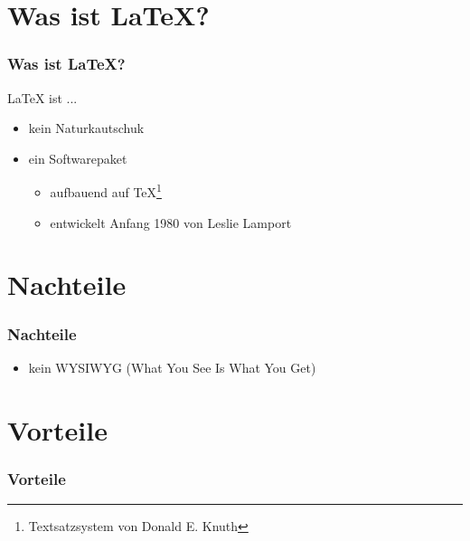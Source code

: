 \documentclass[xcolor=dvipsnames]{beamer}
\subtitle{Wissenschaftliche Arbeiten ohne Haarausfall} %
\institute{AKAD Pinneberg} %
\title{\Title}
\author{\Author}
\date{\today}
\begin{document}
\begin{frame}
    \titlepage
\end{frame}


\frame{\tableofcontents[hideallsubsections]} 

 

\section{Was ist \LaTeX{}?}
\begin{frame}
  \frametitle{Was ist \LaTeX{}?}
	\begin{block}{\LaTeX{} ist ... }	
		\begin{itemize}
  			\item kein Naturkautschuk
	  		\item ein Softwarepaket 
	  		\begin{itemize}
	  			\item aufbauend auf \TeX \footnote{Textsatzsystem von Donald E. Knuth} 
	  			\item entwickelt Anfang 1980 von Leslie Lamport
	  		\end{itemize}
		\end{itemize}
	\end{block}
\end{frame}

\section{Nachteile}
\begin{frame}
  \frametitle{Nachteile}
	\begin{alertblock}{}	
		\begin{itemize}
  			\item kein WYSIWYG (What You See Is What You Get)
		\end{itemize}
	\end{alertblock}
\end{frame}

\section{Vorteile}
\begin{frame}
  \frametitle{Vorteile}
 	 \tableofcontents[currentsection]
\end{frame}
\end{document}

